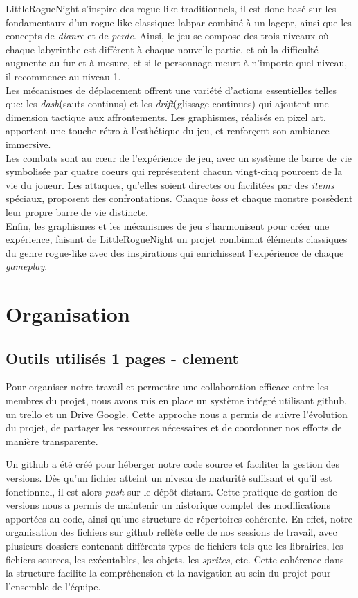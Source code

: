 \documentclass[10pt]{article}
\begin{document}
LittleRogueNight s'inspire des rogue-like traditionnels, il est donc basé sur les fondamentaux d'un rogue-like classique: \gls{labpar} combiné à un
\gls{lagepr}, ainsi que les concepts de \textit{\gls{dianre}} et de \textit{\gls{perde}}. 
Ainsi, le jeu se compose des trois niveaux où chaque labyrinthe est différent à chaque nouvelle partie, 
et où la difficulté augmente au fur et à mesure, et si le personnage meurt à n'importe quel niveau, il recommence au niveau 1.\\

Les mécanismes de déplacement offrent une variété d'actions essentielles telles que: les \textit{\gls{dash}}(sauts continus) et 
les \textit{\gls{drift}}(glissage continues) qui ajoutent une dimension tactique aux affrontements. Les graphismes, réalisés en pixel art, apportent une touche rétro à 
l'esthétique du jeu, et renforçent son ambiance immersive.\\

Les combats sont au cœur de l'expérience de jeu, avec un système de barre de vie symbolisée par quatre coeurs qui représentent chacun vingt-cinq pourcent 
de la vie du joueur. Les attaques, qu'elles soient directes ou facilitées par des \textit{\gls{items}} 
spéciaux, proposent des confrontations. Chaque \textit{boss} et chaque monstre 
possèdent leur propre barre de vie distincte.\\

Enfin, les graphismes et les mécanismes de jeu s'harmonisent pour créer une expérience, faisant de LittleRogueNight un projet 
combinant éléments classiques du genre rogue-like avec des inspirations qui enrichissent l'expérience de chaque \textit{gameplay}.


\section{Organisation}   
\subsection{Outils utilisés 1 pages - clement}
Pour organiser notre travail et permettre une collaboration efficace entre les membres du projet, nous avons mis en place un système intégré utilisant \gls{github}, un \gls{trello} et un Drive Google. Cette approche nous a permis de suivre l'évolution du projet, de partager les ressources nécessaires et de coordonner nos efforts de manière transparente.

Un \gls{github} a été créé pour héberger notre code source et faciliter la gestion des versions. Dès qu'un fichier atteint un niveau de maturité suffisant et qu'il est fonctionnel, il est alors \textit{push} sur le dépôt distant. Cette pratique de gestion de versions nous a permis de maintenir un historique complet des modifications apportées au code, ainsi qu'une structure de répertoires cohérente. En effet, notre organisation des fichiers sur \gls{github} reflète celle de nos sessions de travail, avec plusieurs dossiers contenant différents types de fichiers tels que les librairies, les fichiers sources, les exécutables, les objets, les \textit{\gls{sprites}}, etc. Cette cohérence dans la structure facilite la compréhension et la navigation au sein du projet pour l'ensemble de l'équipe.
\end{document}
